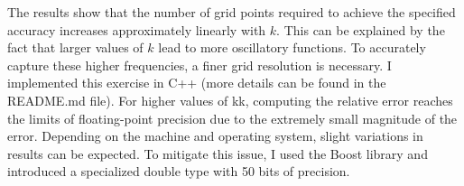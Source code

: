 The results show that the number of grid points required to achieve the specified accuracy increases approximately linearly with $k$. This can be explained by the fact that larger values of $k$ lead to more oscillatory functions. To accurately capture these higher frequencies, a finer grid resolution is necessary.\newline
\newline
I implemented this exercise in C++ (more details can be found in the README.md file). For higher values of kk, computing the relative error reaches the limits of floating-point precision due to the extremely small magnitude of the error. Depending on the machine and operating system, slight variations in results can be expected. To mitigate this issue, I used the Boost library and introduced a specialized double type with 50 bits of precision.
